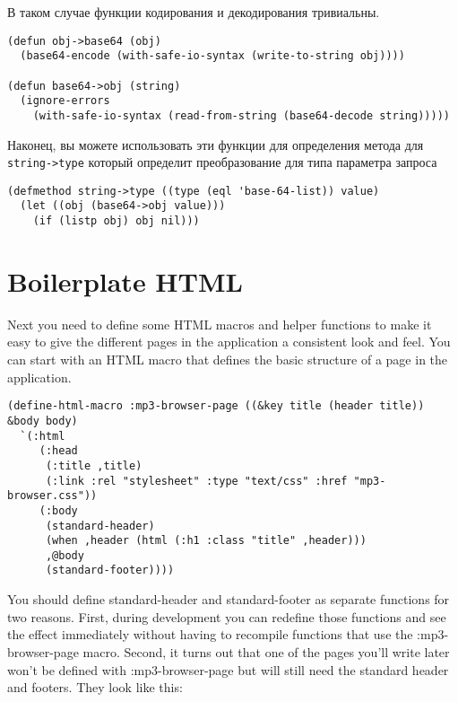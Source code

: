 В таком случае функции кодирования и декодирования тривиальны.

\begin{lstlisting}
(defun obj->base64 (obj)
  (base64-encode (with-safe-io-syntax (write-to-string obj))))

(defun base64->obj (string)
  (ignore-errors
    (with-safe-io-syntax (read-from-string (base64-decode string)))))
\end{lstlisting}

Наконец, вы можете использовать эти функции для определения метода для
\lstinline!string->type! который определит преобразование для типа параметра запроса

\begin{lstlisting}
(defmethod string->type ((type (eql 'base-64-list)) value)
  (let ((obj (base64->obj value)))
    (if (listp obj) obj nil)))
\end{lstlisting}

\section{Boilerplate HTML}

Next you need to define some HTML macros and helper functions to make it easy to give the
different pages in the application a consistent look and feel. You can start with an HTML
macro that defines the basic structure of a page in the application.

\begin{lstlisting}
(define-html-macro :mp3-browser-page ((&key title (header title)) &body body)
  `(:html
     (:head
      (:title ,title)
      (:link :rel "stylesheet" :type "text/css" :href "mp3-browser.css"))
     (:body
      (standard-header)
      (when ,header (html (:h1 :class "title" ,header)))
      ,@body
      (standard-footer))))
\end{lstlisting}

You should define standard-header and standard-footer as separate functions for two
reasons. First, during development you can redefine those functions and see the effect
immediately without having to recompile functions that use the :mp3-browser-page
macro. Second, it turns out that one of the pages you'll write later won't be defined with
:mp3-browser-page but will still need the standard header and footers. They look like
this:

